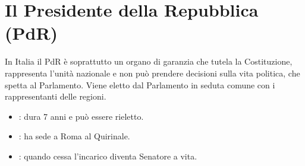 \documentclass[letterpaper,10pt,italian]{sphinxmanual}
\begin{document}
\chapter{Il Presidente della Repubblica (PdR)}
\label{\detokenize{Il Presidente della Repubblica:il-presidente-della-repubblica-pdr}}\label{\detokenize{Il Presidente della Repubblica::doc}}
\sphinxAtStartPar
In Italia il PdR è soprattutto un organo di garanzia che tutela la Costituzione, rappresenta l’unità nazionale e
non può prendere decisioni sulla vita politica, che spetta al Parlamento.
Viene eletto dal Parlamento in seduta comune con i rappresentanti delle regioni.
\begin{itemize}
\item {} 
\sphinxAtStartPar
{}: dura 7 anni e può essere rieletto.

\item {} 
\sphinxAtStartPar
{}: ha sede a Roma al Quirinale.

\item {} 
\sphinxAtStartPar
{}: quando cessa l’incarico diventa Senatore a vita.

\end{itemize}

\sphinxAtStartPar
{}
\end{document}
